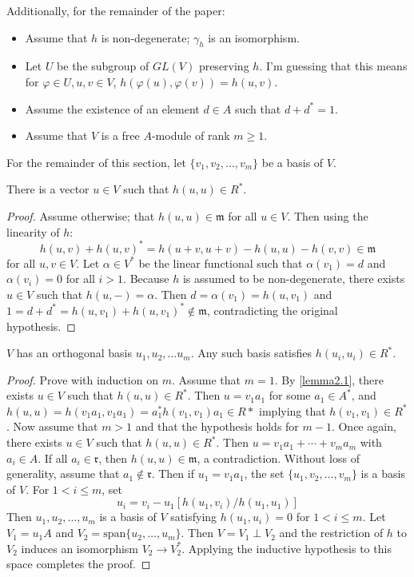 Additionally, for the remainder of the paper:

\begin{itemize}
\item Assume that $h$ is non-degenerate; $\gamma_h$ is an isomorphism.
\item Let $U$ be the subgroup of $GL(V)$ preserving $h$. I'm guessing that this means for $\varphi \in U, u,v \in V$, $h(\varphi(u), \varphi(v)) = h(u,v)$.
\item Assume the existence of an element $d \in A$ such that $d + d^* = 1$.
\item Assume that $V$ is a free $A$-module of rank $m \ge 1$.
\end{itemize}
For the remainder of this section, let $\{v_1, v_2, \dotsc, v_m\}$ be a basis of $V$.

\begin{lemma}\label{lemma2.1}
There is a vector $u \in V$ such that $h(u,u) \in R^*$.
\end{lemma}
\begin{proof}
Assume otherwise; that  $h(u,u) \in \mathfrak{m}$ for all $u \in V$.
Then using the linearity of $h$:
\[
h(u,v) + h(u,v)^* = h(u+v, u+v) - h(u,u) - h(v,v) \in \mathfrak{m}
\]
for all $u,v \in V$.
Let $\alpha \in V^*$ be the linear functional such that $\alpha(v_1) = d$ and $\alpha(v_i) = 0$ for all $i > 1$.
Because $h$ is assumed to be non-degenerate, there exists $u \in V$ such that $h(u,-) = \alpha$.
Then $d = \alpha(v_1) = h(u,v_1)$ and $1 = d + d^* = h(u,v_1) + h(u,v_1)^* \not\in \mathfrak{m}$, contradicting the original hypothesis.
\end{proof}

\begin{lemma}\label{lemma2.2}
$V$ has an orthogonal basis $u_1, u_2, \dotsc u_m$.
Any such basis satisfies $h(u_i, u_i) \in R^*$.
\end{lemma}
\begin{proof}
Prove with induction on $m$.
Assume that $m = 1$.
By \cref{lemma2.1}, there exists $u \in V$ such that $h(u,u) \in R^*$.
Then $u = v_1a_1$ for some $a_1 \in A^*$, and $h(u,u) = h(v_1a_1, v_1a_1) = a_1^*h(v_1,v_1)a_1 \in R*$ implying that $h(v_1, v_1) \in R^*$.
Now assume that $m > 1$ and that the hypothesis holds for $m - 1$.
Once again, there exists $u \in V$ such that $h(u,u) \in R^*$.
Then $u = v_1a_1 + \dotsb + v_m a_m$ with $a_i \in A$.
If all $a_i \in \mathfrak{r}$, then $h(u,u) \in \mathfrak{m}$, a contradiction.
Without loss of generality, assume that $a_1 \not\in \mathfrak{r}$.
Then if $u_1 = v_1 a_1$, the set $\{u_1, v_2, \dotsc, v_m\}$ is a basis of $V$.
For $1 < i \le m$, set
\[
u_i = v_i - u_1[h(u_1,v_i)/h(u_1, u_1)]
\]
Then $u_1, u_2, \dotsc, u_m$ is a basis of $V$ satisfying $h(u_1, u_i) = 0$ for $1 < i \le m$.
Let $V_1 = u_1 A$ and $V_2 = \text{span} \{u_2, \dotsc, u_m\}$.
Then $V = V_1 \perp V_2$ and the restriction of $h$ to $V_2$ induces an isomorphism $V_2 \to V_2^*$.
Applying the inductive hypothesis to this space completes the proof.
\end{proof}

